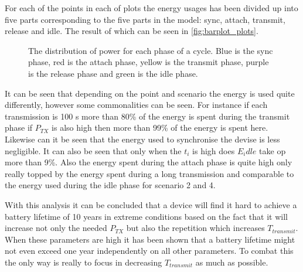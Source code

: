 For each of the points in each of plots the energy usages has been divided up into five parts corresponding to the five parts in the model: 	sync, attach, transmit, release and idle. The result of which can be seen in \autoref{fig:barplot_plots}.
 
 
\begin{figure}[H]
\centering
\begin{minipage}{0.48\textwidth}
\resizebox{\textwidth}{!}{
}
\end{minipage}
\hfill
\begin{minipage}{0.48\textwidth}
\resizebox{\textwidth}{!}{
}
\end{minipage}
\begin{minipage}{0.48\textwidth}
\resizebox{\textwidth}{!}{
}
\end{minipage}
\hfill
\begin{minipage}{0.48\textwidth}
\resizebox{\textwidth}{!}{
}
\end{minipage}
\caption{The distribution of power for each phase of a cycle. Blue is the sync phase, red is the attach phase, yellow is the transmit phase, purple is the release phase and green is the idle phase.}
\label{fig:barplot_plots}
\end{figure}

It can be seen that depending on the point and scenario the energy is used quite differently, however some commonalities can be seen. For instance if each transmission is 100 s more than 80\% of the energy is spent during the transmit phase if $P_{TX}$ is also high then more than 99\% of the energy is spent here. Likewise can it be seen that the energy used to synchronise the devise is less negligible. It can also be seen that only when the $t_i$ is high does $E_idle$ take op more than 9\%. Also the energy spent during the attach phase is quite high only really topped by the energy spent during a long transmission and comparable to the energy used during the idle phase for scenario 2 and 4. 

With this analysis it can be concluded that a device will find it hard to achieve a battery lifetime of 10 years in extreme conditions based on the fact that it will increase not only the needed $P_{TX}$ but also the repetition which increases $T_{transmit}$. When these parameters are high it has been shown that a battery lifetime might not even exceed one year independently on all other parameters. To combat this the only way is really to focus in decreasing $T_{transmit}$ as much as possible. 
